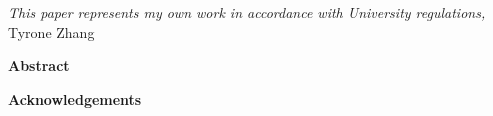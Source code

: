 \documentclass[11pt]{report}
\begin{document}



\thispagestyle{empty}
\vspace*{3in}
\begin{center}
\emph{This paper represents my own work in accordance with University regulations,} \\
Tyrone Zhang %
\end{center}
\clearpage

\begin{center}
\Large \textbf{Abstract}
\end{center}
 
 \clearpage

\begin{center}
\Large \textbf{Acknowledgements}
\end{center}

\clearpage

\thispagestyle{empty}
\tableofcontents
\clearpage

\listoffigures 
\listoftables
\clearpage

\fancyhead{}
\fancyfoot{}
\pagestyle{fancyplain}

{\newpage\renewcommand{\thepage}{\arabic{page}}\setcounter{page}{1}}

\end{document}
